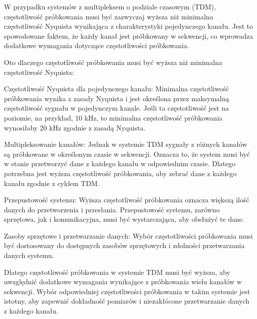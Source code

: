 \begin{frame}[t]
    \begin{block}{\dk}
    \end{block}
W przypadku systemów z multipleksem o podziale czasowym (TDM), częstotliwość próbkowania musi być zazwyczaj wyższa niż minimalna częstotliwość Nyquista wynikająca z charakterystyki pojedynczego kanału. Jest to spowodowane faktem, że każdy kanał jest próbkowany w sekwencji, co wprowadza dodatkowe wymagania dotyczące częstotliwości próbkowania.

Oto dlaczego częstotliwość próbkowania musi być wyższa niż minimalna częstotliwość Nyquista:

Częstotliwość Nyquista dla pojedynczego kanału: Minimalna częstotliwość próbkowania wynika z zasady Nyquista i jest określona przez maksymalną częstotliwość sygnału w pojedynczym kanale. Jeśli ta częstotliwość jest na poziomie, na przykład, 10 kHz, to minimalna częstotliwość próbkowania wynosiłaby 20 kHz zgodnie z zasadą Nyquista.

Multipleksowanie kanałów: Jednak w systemie TDM sygnały z różnych kanałów są próbkowane w określonym czasie w sekwencji. Oznacza to, że system musi być w stanie przetworzyć dane z każdego kanału w odpowiednim czasie. Dlatego potrzebna jest wyższa częstotliwość próbkowania, aby zebrać dane z każdego kanału zgodnie z cyklem TDM.

Przepustowość systemu: Wyższa częstotliwość próbkowania oznacza większą ilość danych do przetworzenia i przesłania. Przepustowość systemu, zarówno sprzętowa, jak i komunikacyjna, musi być wystarczająca, aby obsłużyć te dane.

Zasoby sprzętowe i przetwarzanie danych: Wybór częstotliwości próbkowania musi być dostosowany do dostępnych zasobów sprzętowych i zdolności przetwarzania danych systemu.

Dlatego częstotliwość próbkowania w systemie TDM musi być wyższa, aby uwzględnić dodatkowe wymagania wynikające z próbkowania wielu kanałów w sekwencji. Wybór odpowiedniej częstotliwości próbkowania w takim systemie jest istotny, aby zapewnić dokładność pomiarów i niezakłócone przetwarzanie danych z każdego kanału.
\end{frame}

